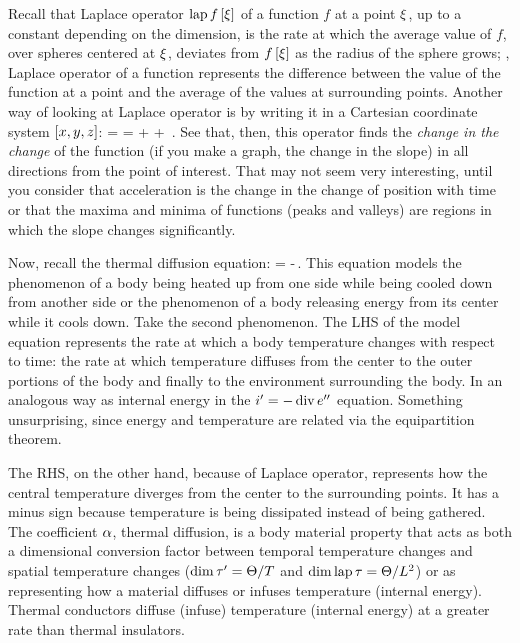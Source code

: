 \begin{geometry}
Recall that Laplace operator $\operatorname{lap} f\left[{\xi}\right]$ of a function $f$ at a point $\xi$, up to a constant depending on the dimension, is the rate at which the average value of $f$, over spheres centered at $\xi$, deviates from $f\left[{\xi}\right]$ as the radius of the sphere grows; \ie, Laplace operator of a function represents the difference between the value of the function at a point and the average of the values at surrounding points. Another way of looking at Laplace operator is by writing it in a Cartesian coordinate system $\left[{x,y,z}\right]$:
\beq
\lap = \lder =  +  + \,.
\eeq
See that, then, this operator finds the \emph{change in the change} of the function (if you make a graph, the change in the slope) in all directions from the point of interest. That may not seem very interesting, until you consider that acceleration is the change in the change of position with time or that the maxima and minima of functions (peaks and valleys) are regions in which the slope changes significantly.

Now, recall the thermal diffusion equation:
\beq
\rate\temp = -\kthdiff\lap\temp\,.
\eeq
This equation models the phenomenon of a body being heated up from one side while being cooled down from another side or the phenomenon of a body releasing energy from its center while it cools down. Take the second phenomenon. The LHS of the model equation represents the rate at which a body temperature changes with respect to time: the rate at which temperature diffuses from the center to the outer portions of the body and finally to the environment surrounding the body. In an analogous way as internal energy in the ${i}^{\prime} = -\operatorname{div}{e}^{\prime\prime}$ equation. Something unsurprising, since energy and temperature are related via the equipartition theorem.

The RHS, on the other hand, because of Laplace operator, represents how the central temperature diverges from the center to the surrounding points. It has a minus sign because temperature is being dissipated instead of being gathered. The coefficient $\alpha$, thermal diffusion, is a body material property that acts as both a dimensional conversion factor between temporal temperature changes and spatial temperature changes ($\dim{\tau}^{\prime} = \Theta/T$ and $\dim\operatorname{lap}\tau = \Theta/L^2$) or as representing how a material diffuses or infuses temperature (internal energy). Thermal conductors diffuse (infuse) temperature (internal energy) at a greater rate than thermal insulators.
\end{geometry}


